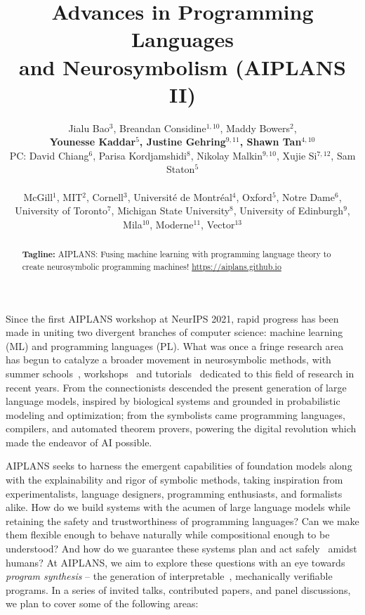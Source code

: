 \documentclass{article}
\title{Advances in Programming Languages\\ and Neurosymbolism (AIPLANS II)}
\author{%
  Jialu Bao$^3$, Breandan Considine$^{1, 10}$, Maddy Bowers$^2$, \\\textbf{Younesse Kaddar$^{5}$, Justine Gehring$^{9, 11}$, Shawn Tan$^{4, 10}$} \\
  PC: David Chiang$^6$, Parisa Kordjamshidi$^8$, Nikolay Malkin$^{9,10}$, Xujie Si$^{7, 12}$, Sam Staton$^{5}$\\\\
  McGill$^1$, MIT$^2$, Cornell$^3$, Universit\'e de Montr\'eal$^4$, Oxford$^{5}$, Notre Dame$^6$,\\University of Toronto$^7$, Michigan State University$^8$, University of Edinburgh$^9$,\\Mila$^{10}$, Moderne$^{11}$, Vector$^{13}$
}
\begin{document}
\maketitle
\vspace{-0.5cm}
\begin{abstract}
  \textbf{Tagline:} AIPLANS: Fusing machine learning with programming language theory to create neurosymbolic programming machines! \url{https://aiplans.github.io} %
\end{abstract}

Since the first AIPLANS workshop at NeurIPS 2021, rapid progress has been made in uniting two divergent branches of computer science: machine learning (ML) and programming languages (PL). What was once a fringe research area has begun to catalyze a broader movement in neurosymbolic methods, with summer schools~\cite{munawar2023neurosymbolic, costilla2024neurosymbolic}, workshops~\cite{thanapalasingam2023nesysgems, belle2023neurosys, munawar2024neurosymbolic, llievski2024neurosymbolic} and tutorials~\cite{palangi2022tutorial, chaudhuri2023poplneurosym, shakarian2024tutorial} dedicated to this field of research in recent years. From the connectionists descended the present generation of large language models, inspired by biological systems and grounded in probabilistic modeling and optimization; from the symbolists came programming languages, compilers, and automated theorem provers, powering the digital revolution which made the endeavor of AI possible.


AIPLANS seeks to harness the emergent capabilities of foundation models along with the explainability and rigor of symbolic methods, taking inspiration from experimentalists, language designers, programming enthusiasts, and formalists alike. How do we build systems with the acumen of large language models while retaining the safety and trustworthiness of programming languages? Can we make them flexible enough to behave naturally while compositional enough to be understood? And how do we guarantee these systems plan and act safely~\cite{hill2021actions} amidst humans? At AIPLANS, we aim to explore these questions with an eye towards \textit{program synthesis} -- the generation of interpretable~\cite{ellis2023dreamcoder}, mechanically verifiable programs. In a series of invited talks, contributed papers, and panel discussions, we plan to cover some of the following areas:
\end{document}
